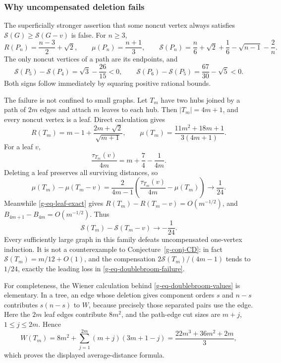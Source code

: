 \documentclass[11pt,a4paper]{article}
\theoremstyle{definition}
\theoremstyle{remark}
\begin{document}
\subsubsection{Why uncompensated deletion fails}

The superficially stronger assertion that some noncut vertex always
satisfies $\mathcal S(G)\ge\mathcal S(G-v)$ is false.
For $n\ge3$,
\[
 R(P_n)=\frac{n-3}{2}+\sqrt2,\qquad
 \mu(P_n)=\frac{n+1}{3},\qquad
 \mathcal S(P_n)=\frac n6+\sqrt2+\frac16-\sqrt{n-1}-\frac2n.
\]
The only noncut vertices of a path are its endpoints, and
\[
 \mathcal S(P_5)-\mathcal S(P_4)=\sqrt3-\frac{26}{15}<0,
 \qquad
 \mathcal S(P_6)-\mathcal S(P_5)=\frac{67}{30}-\sqrt5<0.
\]
Both signs follow immediately by squaring positive rational bounds.

The failure is not confined to small graphs.  Let $T_m$ have two hubs
joined by a path of $2m$ edges and attach $m$ leaves to each hub.  Then
$|T_m|=4m+1$, and every noncut vertex is a leaf.  Direct calculation gives
\begin{equation}
 R(T_m)=m-1+\frac{2m+\sqrt2}{\sqrt{m+1}},\qquad
 \mu(T_m)=\frac{11m^2+18m+1}{3(4m+1)}.
 \label{g-eq-doublebroom-values}
\end{equation}
For a leaf $v$,
\[
 \frac{\tau_{T_m}(v)}{4m}=m+\frac74-\frac1{4m}.
\]
Deleting a leaf preserves all surviving distances, so
\[
 \mu(T_m)-\mu(T_m-v)
 =\frac2{4m-1}
  \left(\frac{\tau_{T_m}(v)}{4m}-\mu(T_m)\right)
 \longrightarrow\frac1{24}.
\]
Meanwhile \eqref{g-eq-leaf-exact} gives
$R(T_m)-R(T_m-v)=O(m^{-1/2})$, and
$B_{4m+1}-B_{4m}=O(m^{-1/2})$.  Thus
\begin{equation}
 \mathcal S(T_m)-\mathcal S(T_m-v)\longrightarrow-\frac1{24}.
 \label{g-eq-doublebroom-failure}
\end{equation}
Every sufficiently large graph in this family defeats uncompensated
one-vertex induction.  It is not a counterexample to
Conjecture~\ref{g-conj-CD}: in fact
$\mathcal S(T_m)=m/12+O(1)$, and the compensation
$2\mathcal S(T_m)/(4m-1)$ tends to $1/24$, exactly the leading loss in
\eqref{g-eq-doublebroom-failure}.

For completeness, the Wiener calculation behind
\eqref{g-eq-doublebroom-values} is elementary.  In a tree, an edge whose
deletion gives component orders $s$ and $n-s$ contributes $s(n-s)$ to
$W$, because precisely those separated pairs use the edge.  Here the
$2m$ leaf edges contribute $8m^2$, and the path-edge cut sizes are
$m+j$, $1\le j\le2m$.  Hence
\[
 W(T_m)=8m^2+\sum_{j=1}^{2m}(m+j)(3m+1-j)
       =\frac{22m^3+36m^2+2m}{3},
\]
which proves the displayed average-distance formula.
\end{document}
